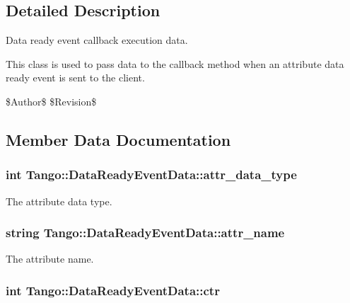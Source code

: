\subsection{Detailed Description}
Data ready event callback execution data. 

This class is used to pass data to the callback method when an attribute data ready event is sent to the client.

\$\-Author\$ \$\-Revision\$ 

\subsection{Member Data Documentation}
\subsubsection[{attr\-\_\-data\-\_\-type}]{\setlength{\rightskip}{0pt plus 5cm}int Tango\-::\-Data\-Ready\-Event\-Data\-::attr\-\_\-data\-\_\-type}\label{classTango_1_1DataReadyEventData_abc2542d1f11b9d8faff06e524793aa69}


The attribute data type. 

\subsubsection[{attr\-\_\-name}]{\setlength{\rightskip}{0pt plus 5cm}string Tango\-::\-Data\-Ready\-Event\-Data\-::attr\-\_\-name}\label{classTango_1_1DataReadyEventData_a2cd31366088f9fee0d06364c2a81796f}


The attribute name. 

\subsubsection[{ctr}]{\setlength{\rightskip}{0pt plus 5cm}int Tango\-::\-Data\-Ready\-Event\-Data\-::ctr}\label{classTango_1_1DataReadyEventData_a68d3c729f0f7aa64540f30c65b2b690f}


